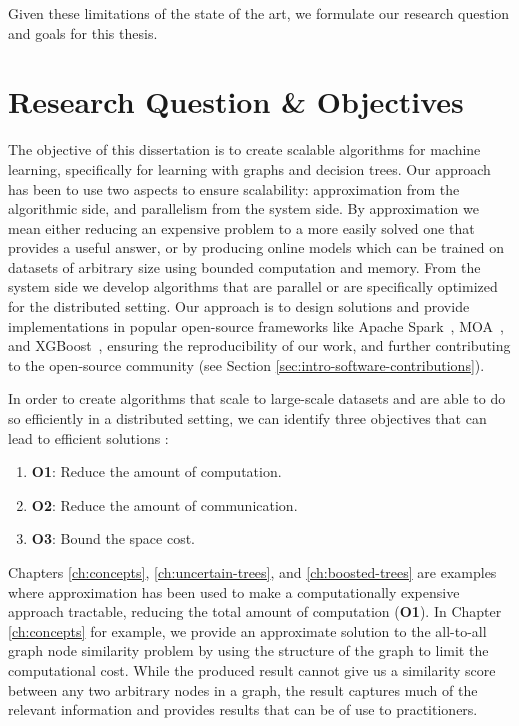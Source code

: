 Given these limitations of the state of the art, we formulate our research question and goals for
this thesis.

\section{Research Question \& Objectives}
\label{sec:intro-question-objectives}

The objective of this dissertation is to create scalable algorithms for machine
learning, specifically for learning with graphs and decision trees. Our approach has been to use two aspects to ensure scalability:
approximation from the algorithmic side, and parallelism from the system
side. By approximation we mean either reducing an expensive problem
to a more easily solved one that provides a useful answer, or by producing
online models which can be trained on datasets of arbitrary size using bounded
computation and memory. From the system side we develop algorithms that are parallel
or are specifically optimized for the distributed setting.
Our approach is to design solutions and provide implementations
in popular open-source frameworks like Apache Spark~\cite{spark},
MOA~\cite{samoa}, and XGBoost~\cite{xgboost}, ensuring the reproducibility
of our work, and further contributing to the open-source community (see Section \ref{sec:intro-software-contributions}).

In order to create algorithms that scale to large-scale datasets and are able to
do so efficiently in a distributed setting, we can identify three objectives that can
lead to efficient solutions \cite{vasia-thesis}:

\begin{enumerate}
	\item \textbf{O1}: Reduce the amount of computation.
	\item \textbf{O2}: Reduce the amount of communication.
	\item \textbf{O3}: Bound the space cost.
\end{enumerate}

Chapters \ref{ch:concepts}, \ref{ch:uncertain-trees}, and \ref{ch:boosted-trees}
are examples where approximation has been used to make a computationally expensive
approach tractable, reducing the total amount of computation (\textbf{O1}).
In Chapter \ref{ch:concepts} for example, we provide an approximate solution
to the all-to-all graph node similarity problem by using the structure of the
graph to limit the computational cost. While the produced result cannot give
us a similarity score between any two arbitrary nodes in a graph, the result captures
much of the relevant information and provides results that can be of use
to practitioners.

